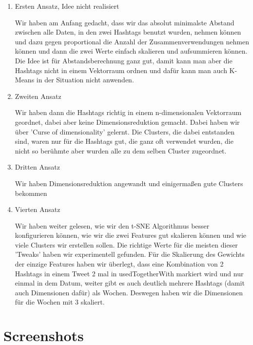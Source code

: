 \begin{enumerate}

\item Ersten Ansatz, Idee nicht realisiert

Wir haben am Anfang gedacht, dass wir das absolut minimalste Abstand zwischen alle Daten, in den zwei Hashtags benutzt wurden, nehmen können und dazu gegen proportional die Anzahl der Zusammenverwendungen nehmen können und dann die zwei Werte einfach skalieren und aufsummieren können. Die Idee ist für Abstandsberechnung ganz gut, damit kann man aber die Hashtags nicht in einem Vektorraum ordnen und dafür kann man auch K-Means in der Situation nicht anwenden.

\item Zweiten Ansatz

Wir haben dann die Hashtags richtig in einem n-dimensionalen Vektorraum geordnet, dabei aber keine Dimensionsreduktion gemacht. Dabei haben wir über 'Curse of dimensionality' gelernt. Die Clusters, die dabei entstanden sind, waren nur für die Hashtags gut, die ganz oft verwendet wurden, die nicht so berühmte aber wurden alle zu dem selben Cluster zugeordnet.

\item Dritten Ansatz

Wir haben Dimensionsreduktion angewandt und einigermaßen gute Clusters bekommen

\item Vierten Ansatz

Wir haben weiter gelesen, wie wir den t-SNE Algorithmus besser konfigurieren können, wie wir die zwei Features gut skalieren können und wie viele Clusters wir erstellen sollen. Die richtige Werte für die meisten dieser 'Tweaks' haben wir experimentell gefunden. Für die Skalierung des Gewichts der einzige Features haben wir überlegt, dass eine Kombination von 2 Hashtags in einem Tweet 2 mal in usedTogetherWith markiert wird und nur einmal in dem Datum, weiter gibt es auch deutlich mehrere Hashtags (damit auch Dimensionen dafür) als Wochen. Deswegen haben wir die Dimensionen für die Wochen mit 3 skaliert.

\end{enumerate}


\section*{Screenshots}

